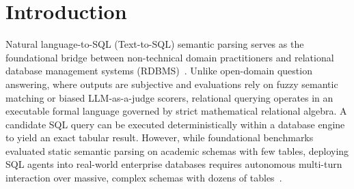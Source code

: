 \documentclass{article}
\theoremstyle{plain}
\theoremstyle{definition}
\theoremstyle{remark}
\begin{document}
\section{Introduction}
\label{sec:intro}

Natural language-to-SQL (Text-to-SQL) semantic parsing serves as the foundational bridge between non-technical domain practitioners and relational database management systems (RDBMS)~\citep{yu2018spider,li2023bird}. Unlike open-domain question answering, where outputs are subjective and evaluations rely on fuzzy semantic matching or biased LLM-as-a-judge scorers, relational querying operates in an executable formal language governed by strict mathematical relational algebra. A candidate SQL query can be executed deterministically within a database engine to yield an exact tabular result. However, while foundational benchmarks evaluated static semantic parsing on academic schemas with few tables, deploying SQL agents into real-world enterprise databases requires autonomous multi-turn interaction over massive, complex schemas with dozens of tables~\citep{yang2026harnesssql}.
\end{document}
